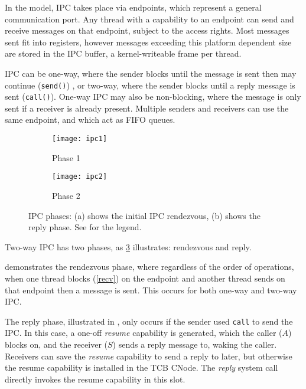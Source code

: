 In the \selfour model,
\gls{IPC} takes place via endpoints, which represent a general communication port. Any thread with a
capability to an endpoint can send and receive messages on that endpoint, subject to the access
rights. Most messages sent fit into registers, however messages exceeding this platform dependent
size are stored in the \gls{IPC} buffer, a kernel-writeable frame per
thread. 

IPC can be one-way, where the sender blocks until the message is sent then may continue
(\texttt{send()}) , or two-way,
where the sender blocks until a reply message is sent (\texttt{call()}). One-way IPC may also be
non-blocking, where the message is only sent if a receiver is already present.
Multiple senders and receivers can use the same endpoint, and which act as \gls{FIFO}
queues. 

\begin{figure}
    \centering
    \begin{subfigure}[h]{0.48\textwidth}
        \centering
        \texttt{[image: ipc1]}
        \caption{Phase 1}
        \label{f:ipc1}
    \end{subfigure}%
    \begin{subfigure}[h]{0.48\textwidth}
        \centering
        \texttt{[image: ipc2]}
        \caption{Phase 2}
        \label{f:ipc2}
    \end{subfigure}
    \label{f:ipc}
    \caption{IPC phases: (a) shows the initial IPC rendezvous, (b) shows the
    reply phase. See  for the legend.}
\end{figure}

Two-way IPC has two phases, as \cref{f:ipc} illustrates: rendezvous and reply.

 demonstrates the rendezvous phase, where regardless of the order of operations, 
when one thread blocks (\cref{recv}) on the endpoint and another thread sends on that endpoint
then a message is sent. This occurs for both one-way and two-way \gls{IPC}.

The reply phase, illustrated in , only occurs if the sender used \texttt{call} to send
the \gls{IPC}. In this case, a one-off \emph{resume} capability is generated, which the caller ($A$)
blocks on, and the receiver ($S$) sends a reply message to, waking the caller. Receivers can save
the \emph{resume} capability to send a reply to later, but otherwise the resume capability is
installed in the \gls{TCB} CNode. The \emph{reply} system call directly invokes the resume
capability in this slot. 

